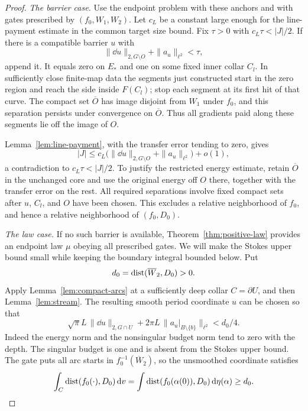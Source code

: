 \begin{proof}
\smallskip\noindent\emph{The barrier case.}
Use the endpoint problem with these anchors and with gates prescribed
by $(f_0,W_1,W_2)$.  Let $c_L$ be a constant large enough for the
line-payment estimate in the common target size bound.  Fix
$\tau>0$ with $c_L\tau<|J|/2$.
If there is a compatible barrier $u$ with
\[
 \|\dd u\|_{2,G\setminus O}+\|a_u\|_{\ell^2}<\tau,
\]
append it.  It equals zero on $E_*$ and one on some fixed inner
collar $C_l$.  In sufficiently close finite-map data the segments just
constructed start in the zero region and reach the side inside
$F(C_l)$; stop each segment at its first hit of that curve.  The
compact set $\overline O$ has image disjoint from $W_1$ under
$f_0$, and this separation persists under convergence on
$\overline O$.  Thus all gradients paid along these segments lie off
the image of $O$.

Lemma~\ref{lem:line-payment}, with the transfer error tending to zero,
gives
\[
 |J|\le c_L\bigl(\|\dd u\|_{2,G\setminus O}
                          +\|a_u\|_{\ell^2}\bigr)+o(1),
\]
a contradiction to $c_L\tau<|J|/2$.  To justify the restricted
energy estimate, retain $\overline O$ in the unchanged
core and use the original energy off $O$ there, together with the
transfer error on the rest.  All required separations involve fixed
compact sets after $u$, $C_l$, and $O$ have been chosen.  This excludes
a relative neighborhood of $f_0$, and hence a relative neighborhood
of $(f_0,D_0)$.

\smallskip\noindent\emph{The law case.}
If no such barrier is available, Theorem~\ref{thm:positive-law}
provides an endpoint law $\mu$ obeying all prescribed gates.  We will
make the Stokes upper bound small while keeping the boundary integral
bounded below.  Put
\[
 d_0=\operatorname{dist}(\overline W_2,D_0)>0.
\]
Apply Lemma~\ref{lem:compact-arcs} at a sufficiently deep collar
$C=\partial U$, and then Lemma~\ref{lem:stream}.  The resulting smooth
period coordinate $u$ can be chosen so that
\begin{equation}\label{eq:bad-pair-small-stream}
 \sqrt\pi L\,\|\dd u\|_{2,G\cap U}
  +2\pi L\,\|a_u|_{B\setminus\{b\}}\|_{\ell^2}
 <d_0/4.
\end{equation}
Indeed the energy norm and the nonsingular budget norm tend to zero
with the depth.  The singular budget is one and is absent from the
Stokes upper bound.
The gate puts all arc starts in $f_0^{-1}(\overline W_2)$, so the
unsmoothed coordinate satisfies
\begin{equation}\label{eq:bad-pair-lower-bound}
 \int_C\operatorname{dist}(f_0(\cdot),D_0)\,\mathrm d v
 =\int\operatorname{dist}(f_0(\alpha(0)),D_0)\,\mathrm d\eta(\alpha)
 \ge d_0.
\end{equation}


\end{proof}
